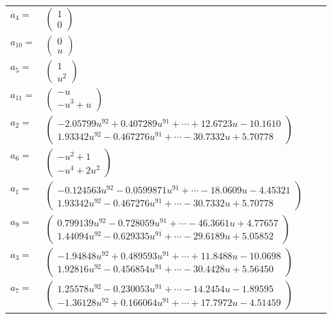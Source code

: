\documentclass[1p]{elsarticle_modified}
\theoremstyle{definition}
\begin{document}
\begin{tabular}{m{7pt} m{180pt} m{7pt} m{180pt} }
\flushright $a_{4}=$&$\begin{pmatrix}1\\0\end{pmatrix}$ \\
\flushright $a_{10}=$&$\begin{pmatrix}0\\u\end{pmatrix}$ \\
\flushright $a_{5}=$&$\begin{pmatrix}1\\u^2\end{pmatrix}$ \\
\flushright $a_{11}=$&$\begin{pmatrix}- u\\- u^3+u\end{pmatrix}$ \\
\flushright $a_{2}=$&$\begin{pmatrix}-2.05799 u^{92}+0.407289 u^{91}+\cdots+12.6723 u-10.1610\\1.93342 u^{92}-0.467276 u^{91}+\cdots-30.7332 u+5.70778\end{pmatrix}$ \\
\flushright $a_{6}=$&$\begin{pmatrix}- u^2+1\\- u^4+2 u^2\end{pmatrix}$ \\
\flushright $a_{1}=$&$\begin{pmatrix}-0.124563 u^{92}-0.0599871 u^{91}+\cdots-18.0609 u-4.45321\\1.93342 u^{92}-0.467276 u^{91}+\cdots-30.7332 u+5.70778\end{pmatrix}$ \\
\flushright $a_{9}=$&$\begin{pmatrix}0.799139 u^{92}-0.728059 u^{91}+\cdots-46.3661 u+4.77657\\1.44094 u^{92}-0.629335 u^{91}+\cdots-29.6189 u+5.05852\end{pmatrix}$ \\
\flushright $a_{3}=$&$\begin{pmatrix}-1.94848 u^{92}+0.489593 u^{91}+\cdots+11.8488 u-10.0698\\1.92816 u^{92}-0.456854 u^{91}+\cdots-30.4428 u+5.56450\end{pmatrix}$ \\
\flushright $a_{7}=$&$\begin{pmatrix}1.25578 u^{92}-0.230053 u^{91}+\cdots-14.2454 u-1.89595\\-1.36128 u^{92}+0.166064 u^{91}+\cdots+17.7972 u-4.51459\end{pmatrix}$ \\

\end{tabular}
\end{document}
